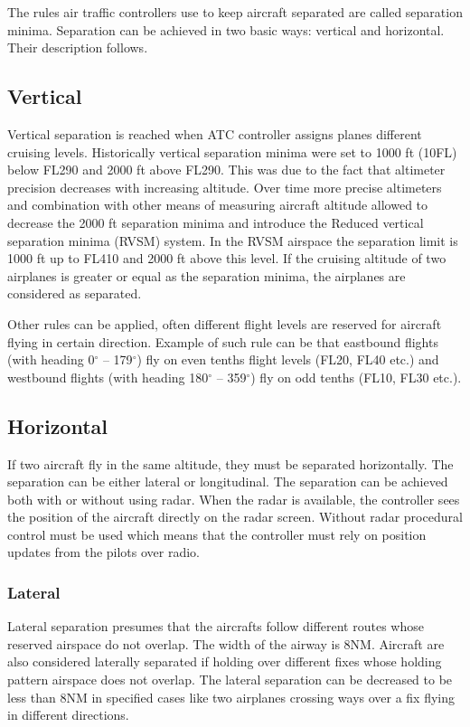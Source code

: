 The rules air traffic controllers use to keep aircraft separated are called separation minima. Separation can be achieved in two basic ways: vertical and horizontal. Their description follows.

\subsection{Vertical}

Vertical separation is reached when ATC controller assigns planes different cruising levels. Historically vertical separation minima were set to 1000 ft (10FL) below FL290 and 2000 ft above FL290. This was due to the fact that altimeter precision decreases with increasing altitude. Over time more precise altimeters and combination with other means of measuring aircraft altitude allowed to decrease the 2000 ft separation minima and introduce the Reduced vertical separation minima (RVSM) system. In the RVSM airspace the separation limit is 1000 ft up to FL410 and 2000 ft above this level. If the cruising altitude of two airplanes is greater or equal as the separation minima, the airplanes are considered as separated. \cite{aim}

Other rules can be applied, often different flight levels are reserved for aircraft flying in certain direction. Example of such rule can be that eastbound flights (with heading 0$^{\circ}$ – 179$^{\circ}$) fly on even tenths flight levels (FL20, FL40 etc.) and westbound flights (with heading 180$^{\circ}$ – 359$^{\circ}$) fly on odd tenths (FL10, FL30 etc.).

\subsection{Horizontal}

If two aircraft fly in the same altitude, they must be separated horizontally. The separation can be either lateral or longitudinal. The separation can be achieved both with or without using radar. When the radar is available, the controller sees the position of the aircraft directly on the radar screen. Without radar procedural control must be used which means that the controller must rely on position updates from the pilots over radio.

\subsubsection{Lateral}

Lateral separation presumes that the aircrafts follow different routes whose reserved airspace do not overlap. \cite[Chapter 7]{nolan} The width of the airway is 8NM. Aircraft are also considered laterally separated if holding over different fixes whose holding pattern airspace does not overlap. The lateral separation can be decreased to be less than 8NM in specified cases like two airplanes crossing ways over a fix flying in different directions.

